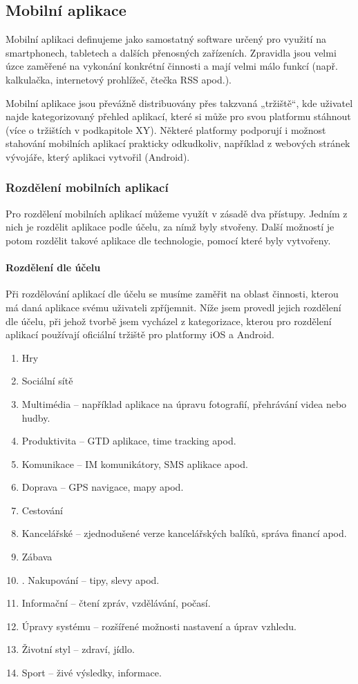 \subsection{Mobilní aplikace}
Mobilní aplikaci definujeme jako samostatný software určený pro využití na smartphonech, tabletech a dalších přenosných zařízeních. Zpravidla jsou velmi úzce zaměřené na vykonání konkrétní činnosti a mají velmi málo funkcí (např. kalkulačka, internetový prohlížeč, čtečka RSS apod.).

Mobilní aplikace jsou převážně distribuovány přes takzvaná „tržiště“, kde uživatel najde kategorizovaný přehled aplikací, které si může pro svou platformu stáhnout (více o tržištích v podkapitole XY). Některé platformy podporují i možnost stahování mobilních aplikací prakticky odkudkoliv, například z webových stránek vývojáře, který aplikaci vytvořil (Android).

\subsubsection{Rozdělení mobilních aplikací}
Pro rozdělení mobilních aplikací můžeme využít v zásadě dva přístupy. Jedním z nich je rozdělit aplikace podle účelu, za nímž byly stvořeny. Další možností je potom rozdělit takové aplikace dle technologie, pomocí které byly vytvořeny.

\paragraph{Rozdělení dle účelu}
Při rozdělování aplikací dle účelu se musíme zaměřit na oblast činnosti, kterou má daná aplikace svému uživateli zpříjemnit. Níže jsem provedl jejich rozdělení dle účelu, při jehož tvorbě jsem vycházel z kategorizace, kterou pro rozdělení aplikací používají oficiální tržiště pro platformy iOS a Android.

\begin{enumerate}
	\item Hry
	\item Sociální sítě
	\item Multimédia – například aplikace na úpravu fotografií, přehrávání videa nebo hudby.
	\item Produktivita – GTD aplikace, time tracking apod.
	\item Komunikace – IM komunikátory, SMS aplikace apod.
	\item Doprava – GPS navigace, mapy apod.
	\item Cestování
	\item Kancelářské – zjednodušené verze kancelářských balíků, správa financí apod.
	\item Zábava
	\item. Nakupování – tipy, slevy apod.
	\item Informační – čtení zpráv, vzdělávání, počasí.
	\item Úpravy systému – rozšířené možnosti nastavení a úprav vzhledu.
	\item Životní styl – zdraví, jídlo.
	\item Sport – živé výsledky, informace.
\end{enumerate}

